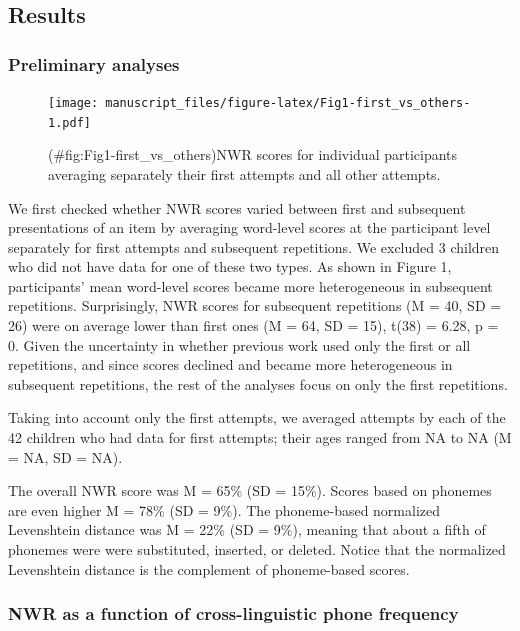 \documentclass[english,,man,floatsintext]{apa6}
\begin{document}
\subsection{Results}\label{results}

\subsubsection{Preliminary analyses}\label{preliminary-analyses}

\begin{figure}
\centering
\texttt{[image: manuscript\_files/figure-latex/Fig1-first\_vs\_others-1.pdf]}
\caption{(\#fig:Fig1-first\_vs\_others)NWR scores for individual
participants averaging separately their first attempts and all other
attempts.}
\end{figure}

We first checked whether NWR scores varied between first and subsequent
presentations of an item by averaging word-level scores at the
participant level separately for first attempts and subsequent
repetitions. We excluded 3 children who did not have data for one of
these two types. As shown in Figure 1, participants' mean word-level
scores became more heterogeneous in subsequent repetitions.
Surprisingly, NWR scores for subsequent repetitions (M = 40, SD = 26)
were on average lower than first ones (M = 64, SD = 15), t(38) = 6.28, p
= 0. Given the uncertainty in whether previous work used only the first
or all repetitions, and since scores declined and became more
heterogeneous in subsequent repetitions, the rest of the analyses focus
on only the first repetitions.

Taking into account only the first attempts, we averaged attempts by
each of the 42 children who had data for first attempts; their ages
ranged from NA to NA (M = NA, SD = NA).

The overall NWR score was M = 65\% (SD = 15\%). Scores based on phonemes
are even higher M = 78\% (SD = 9\%). The phoneme-based normalized
Levenshtein distance was M = 22\% (SD = 9\%), meaning that about a fifth
of phonemes were were substituted, inserted, or deleted. Notice that the
normalized Levenshtein distance is the complement of phoneme-based
scores.

\subsubsection{NWR as a function of cross-linguistic phone
frequency}\label{nwr-as-a-function-of-cross-linguistic-phone-frequency}
\end{document}
